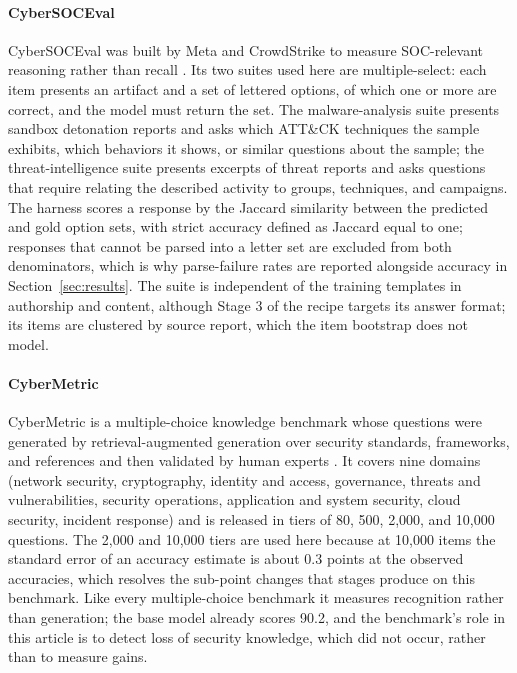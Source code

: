 \documentclass[twocolumn]{svjour3}
\begin{document}
\begin{appendix}
\paragraph{CyberSOCEval}
CyberSOCEval was built by Meta and CrowdStrike to measure SOC-relevant reasoning rather than recall \cite{deason2025cybersoceval}. Its two suites used here are multiple-select: each item presents an artifact and a set of lettered options, of which one or more are correct, and the model must return the set. The malware-analysis suite presents sandbox detonation reports and asks which ATT\&CK techniques the sample exhibits, which behaviors it shows, or similar questions about the sample; the threat-intelligence suite presents excerpts of threat reports and asks questions that require relating the described activity to groups, techniques, and campaigns. The harness scores a response by the Jaccard similarity between the predicted and gold option sets, with strict accuracy defined as Jaccard equal to one; responses that cannot be parsed into a letter set are excluded from both denominators, which is why parse-failure rates are reported alongside accuracy in Section~\ref{sec:results}. The suite is independent of the training templates in authorship and content, although Stage 3 of the recipe targets its answer format; its items are clustered by source report, which the item bootstrap does not model.

\paragraph{CyberMetric}
CyberMetric is a multiple-choice knowledge benchmark whose questions were generated by retrieval-augmented generation over security standards, frameworks, and references and then validated by human experts \cite{tihanyi2024cybermetric}. It covers nine domains (network security, cryptography, identity and access, governance, threats and vulnerabilities, security operations, application and system security, cloud security, incident response) and is released in tiers of 80, 500, 2,000, and 10,000 questions. The 2,000 and 10,000 tiers are used here because at 10,000 items the standard error of an accuracy estimate is about 0.3 points at the observed accuracies, which resolves the sub-point changes that stages produce on this benchmark. Like every multiple-choice benchmark it measures recognition rather than generation; the base model already scores 90.2, and the benchmark's role in this article is to detect loss of security knowledge, which did not occur, rather than to measure gains.


\end{appendix}
\end{document}
